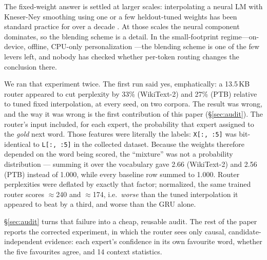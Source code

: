 \documentclass[11pt]{article}
\begin{document}
The fixed-weight answer is settled at larger scales: interpolating a neural LM
with Kneser-Ney smoothing using one or a few heldout-tuned weights has been
standard practice for over a decade
\cite{mikolov2011,sundermeyer2012,chang2015}. At those scales the neural
component dominates, so the blending scheme is a detail. In the
small-footprint regime---on-device, offline, CPU-only personalization
\cite{mathur2023}---the blending scheme is one of the few levers left, and
nobody has checked whether per-token routing changes the conclusion there.

We ran that experiment twice. The first run said yes, emphatically: a 13.5\,KB
router appeared to cut perplexity by 33\% (WikiText-2) and 27\% (PTB) relative
to tuned fixed interpolation, at every seed, on two corpora. The result was
wrong, and the way it was wrong is the first contribution of this paper
(\S\ref{sec:audit}). The router's input included, for each expert, the
probability that expert assigned to the \emph{gold} next word. Those features
were literally the labels: \texttt{X[:, :5]} was bit-identical to
\texttt{L[:, :5]} in the collected dataset. Because the weights therefore
depended on the word being scored, the ``mixture'' was not a probability
distribution --- summing it over the vocabulary gave 2.66 (WikiText-2) and
2.56 (PTB) instead of 1.000, while every baseline row summed to 1.000. Router
perplexities were deflated by exactly that factor; normalized, the same trained
router scores $\approx$240 and $\approx$174, i.e.\ \emph{worse} than the tuned
interpolation it appeared to beat by a third, and worse than the GRU alone.

\S\ref{sec:audit} turns that failure into a cheap, reusable audit. The rest of
the paper reports the corrected experiment, in which the router sees only
causal, candidate-independent evidence: each expert's confidence in its own
favourite word, whether the five favourites agree, and 14 context statistics.
\end{document}
